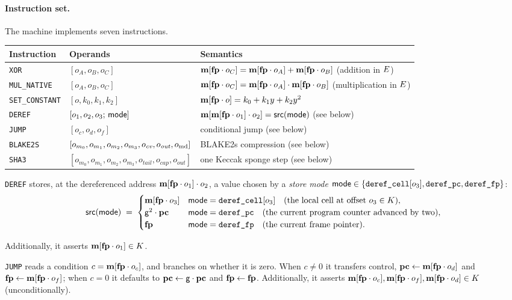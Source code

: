 \paragraph{Instruction set.} The machine implements seven instructions.
\begin{center}
\begin{tabularx}{\textwidth}{@{}llX@{}}
\hline
Instruction & Operands & Semantics\\
\hline
\texttt{XOR}           & $[o_A,o_B,o_C]$ & $\mathbf{m}[\mathbf{fp}\cdot o_C]=\mathbf{m}[\mathbf{fp}\cdot o_A]+\mathbf{m}[\mathbf{fp}\cdot o_B]$ \quad(addition in $E$)\\
\texttt{MUL\_NATIVE}   & $[o_A,o_B,o_C]$ & $\mathbf{m}[\mathbf{fp}\cdot o_C]=\mathbf{m}[\mathbf{fp}\cdot o_A]\cdot\mathbf{m}[\mathbf{fp}\cdot o_B]$ (multiplication in $E$)\\
\texttt{SET\_CONSTANT} & $[o,k_0,k_1,k_2]$ & $\mathbf{m}[\mathbf{fp}\cdot o]=k_0+k_1y+k_2y^{2}$\\
\texttt{DEREF}         & $[o_1,o_2,o_3;\,\mathsf{mode}]$ & $\mathbf{m}[\mathbf{m}[\mathbf{fp}\cdot o_1]\cdot o_2]=\mathsf{src}(\mathsf{mode})$ (see below)\\
\texttt{JUMP}          & $[o_c,o_d,o_f]$ & conditional jump (see below)\\
\texttt{BLAKE2S}        & $[o_{m_0},o_{m_1},o_{m_2},o_{m_3},o_{\mathit{cv}},o_{\mathit{out}},o_{\mathrm{md}}]$ & BLAKE2s compression (see below)\\
\texttt{SHA3}           & $[o_{m_0},o_{m_1},o_{m_2},o_{m_3},o_{\mathit{tail}},o_{\mathit{cap}},o_{\mathit{out}}]$ & one Keccak sponge step (see below)\\
\hline
\end{tabularx}
\end{center}


\texttt{DEREF} stores, at the dereferenced address $\mathbf{m}[\mathbf{fp}\cdot o_1]\cdot o_2$, a value chosen by a \emph{store mode} $\mathsf{mode}\in\{\texttt{deref\_cell}[o_3],\texttt{deref\_pc},\texttt{deref\_fp}\}$:
\[
  \mathsf{src}(\mathsf{mode})\;=\;
  \begin{cases}
    \mathbf{m}[\mathbf{fp}\cdot o_3] & \mathsf{mode}=\texttt{deref\_cell}[o_3] \quad(\text{the local cell at offset }o_3 \in K),\\
    \mathsf{g}^{2}\cdot\mathbf{pc} & \mathsf{mode}=\texttt{deref\_pc} \quad(\text{the current program counter advanced by two}),\\
    \mathbf{fp} & \mathsf{mode}=\texttt{deref\_fp} \quad(\text{the current frame pointer}).
  \end{cases}
\]

Additionally, it asserts $\mathbf{m}[\mathbf{fp}\cdot o_1] \in K$.

\vspace{5mm}


\texttt{JUMP} reads a condition $c=\mathbf{m}[\mathbf{fp}\cdot o_c]$, and branches on whether it is zero. When $c\neq0$ it transfers control, $\mathbf{pc}\gets\mathbf{m}[\mathbf{fp}\cdot o_d]$ and $\mathbf{fp}\gets\mathbf{m}[\mathbf{fp}\cdot o_f]$; when $c=0$ it defaults to $\mathbf{pc}\gets\mathsf{g}\cdot\mathbf{pc}$ and $\mathbf{fp}\gets\mathbf{fp}$. Additionally, it asserts $\mathbf{m}[\mathbf{fp}\cdot o_c],\mathbf{m}[\mathbf{fp}\cdot o_f], \mathbf{m}[\mathbf{fp}\cdot o_d] \in K$ (unconditionally).

